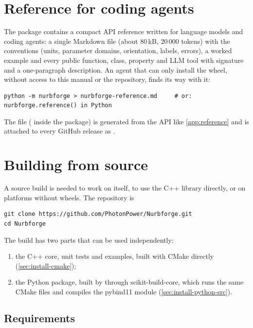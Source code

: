 \section{Reference for coding agents}\label{sec:install-agent-reference}

The package contains a compact API reference written for language models and coding agents: a
single Markdown file (about 80\,kB, 20\,000 tokens) with the conventions (units, parameter
domains, orientation, labels, errors), a worked example and every public function, class,
property and LLM tool with signature and a one-paragraph description. An agent that can only
install the wheel, without access to this manual or the repository, finds its way with it:

\begin{lstlisting}[style=text]
python -m nurbforge > nurbforge-reference.md     # or: nurbforge.reference() in Python
\end{lstlisting}

The file ( inside the package) is generated from the API like
\cref{app:reference} and is attached to every GitHub release as
.

\section{Building from source}\label{sec:install-source}

A source build is needed to work on \NF{} itself, to use the C++ library directly, or on platforms
without wheels. The repository is
\begin{lstlisting}[style=shell]
git clone https://github.com/PhotonPower/Nurbforge.git
cd Nurbforge
\end{lstlisting}

The build has two parts that can be used independently:
\begin{enumerate}
  \item the C++ core, unit tests and examples, built with CMake directly
    (\cref{sec:install-cmake});
  \item the Python package, built by  through scikit-build-core, which runs the same
    CMake files and compiles the pybind11 module (\cref{sec:install-python-src}).
\end{enumerate}

\subsection{Requirements}

